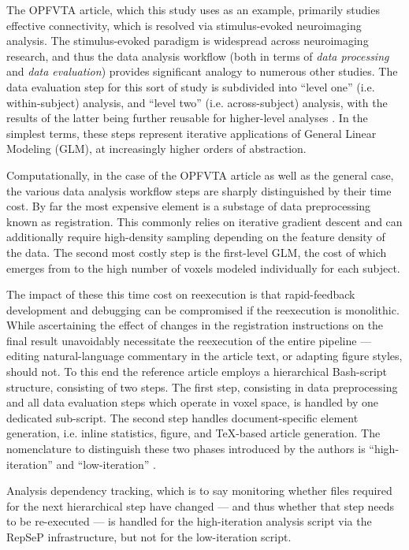 The OPFVTA article, which this study uses as an example, primarily studies effective connectivity, which is resolved via stimulus-evoked neuroimaging analysis.
The stimulus-evoked paradigm is widespread across neuroimaging research, and thus the data analysis workflow (both in terms of \emph{data processing} and \emph{data evaluation}) provides significant analogy to numerous other studies.
The data evaluation step for this sort of study is subdivided into “level one” (i.e. within-subject) analysis, and “level two” (i.e. across-subject) analysis, with the results of the latter being further reusable for higher-level analyses \cite{Friston1995}.
In the simplest terms, these steps represent iterative applications of General Linear Modeling (GLM), at increasingly higher orders of abstraction.


Computationally, in the case of the OPFVTA article as well as the general case, the various data analysis workflow steps are sharply distinguished by their time cost.
By far the most expensive element is a substage of data preprocessing known as registration.
This commonly relies on iterative gradient descent and can additionally require high-density sampling depending on the feature density of the data.
The second most costly step is the first-level GLM, the cost of which emerges from to the high number of voxels modeled individually for each subject.

The impact of these this time cost on reexecution is that rapid-feedback development and debugging can be compromised if the reexecution is monolithic.
While ascertaining the effect of changes in the registration instructions on the final result unavoidably necessitate the reexecution of the entire pipeline — editing natural-language commentary in the article text, or adapting figure styles, should not.
To this end the reference article employs a hierarchical Bash-script structure, consisting of two steps.
The first step, consisting in data preprocessing and all data evaluation steps which operate in voxel space, is handled by one dedicated sub-script.
The second step handles document-specific element generation, i.e. inline statistics, figure, and TeX-based article generation.
The nomenclature to distinguish these two phases introduced by the authors is “high-iteration” and “low-iteration” \cite{repsep}.

Analysis dependency tracking, which is to say monitoring whether files required for the next hierarchical step have changed — and thus whether that step needs to be re-executed — is handled for the high-iteration analysis script via the RepSeP infrastructure, but not for the low-iteration script.


